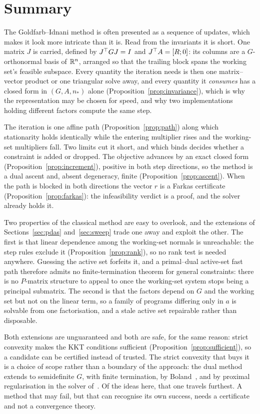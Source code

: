 \section{Summary}
\label{sec:conclusions}

The Goldfarb--Idnani method is often presented as a sequence of updates, which
makes it look more intricate than it is. Read from the invariants it is short. One
matrix $J$ is carried, defined by $J^{\top} G J = I$ and $J^{\top} A = [R;0]$: its columns
are a $G$-orthonormal basis of $\mathbb{R}^n$, arranged so that the trailing block spans
the working set's feasible subspace. Every quantity the iteration needs is then one
matrix--vector product or one triangular solve away, and every quantity it
\emph{consumes} has a closed form in $(G, A, n_*)$ alone
(Proposition~\ref{prop:invariance}), which is why the representation may be
chosen for speed, and why two implementations holding different factors compute
the same step.

The iteration is one affine path (Proposition~\ref{prop:path}) along which
stationarity holds identically while the entering multiplier rises and the
working-set multipliers fall. Two limits cut it short, and which binds decides
whether a constraint is added or dropped. The objective advances by an exact closed
form (Proposition~\ref{prop:increment}), positive in both step directions, so the
method is a dual ascent and, absent degeneracy, finite
(Proposition~\ref{prop:ascent}). When the path is blocked in both directions the
vector $r$ is a Farkas certificate (Proposition~\ref{prop:farkas}): the
infeasibility verdict is a proof, and the solver already holds it.

Two properties of the classical method are easy to overlook, and the extensions
of Sections~\ref{sec:pdas} and~\ref{sec:sweep} trade one away and exploit the
other. The first is that linear dependence among the working-set normals is
unreachable: the step rules exclude it (Proposition~\ref{prop:rank}), so no rank
test is needed anywhere. Guessing the active set forfeits it, and a primal--dual
active-set fast path therefore admits no finite-termination theorem for general
constraints: there is no $P$-matrix structure to appeal to once the working-set
system stops being a principal submatrix. The second is that the factors depend
on $G$ and the working set but not on the linear term, so a family of programs
differing only in $a$ is solvable from one factorisation, and a stale active set
repairable rather than disposable.

Both extensions are unguaranteed and both are safe, for the same reason: strict
convexity makes the KKT conditions sufficient (Proposition~\ref{prop:sufficient}),
so a candidate can be certified instead of trusted. The strict convexity that
buys it is a choice of scope rather than a boundary of the approach: the dual
method extends to semidefinite $G$, with finite termination, by
Boland~\cite{boland1997}, and by proximal regularisation in the solver
of~\cite{arnstrom2022daqp}. Of the ideas here, that one travels furthest. A method that may fail, but that can recognise its own success,
needs a certificate and not a convergence theory.


